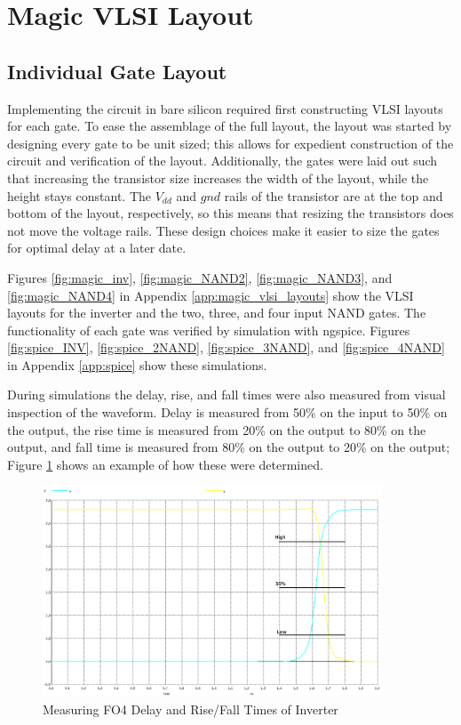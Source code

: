 \documentclass[12pt]{article}
\begin{document}
\section{Magic VLSI Layout}
\subsection{Individual Gate Layout}
Implementing the circuit in bare silicon required first constructing VLSI layouts for each gate.
To ease the assemblage of the full layout, the layout was started by designing every gate to be unit sized; this allows for expedient construction of the circuit and verification of the layout.
Additionally, the gates were laid out such that increasing the transistor size increases the width of the layout, while the height stays constant.
The \(V_{dd}\) and \(gnd\) rails of the transistor are at the top and bottom of the layout, respectively, so this means that resizing the transistors does not move the voltage rails.
These design choices make it easier to size the gates for optimal delay at a later date.

Figures \ref{fig:magic_inv}, \ref{fig:magic_NAND2}, \ref{fig:magic_NAND3}, and \ref{fig:magic_NAND4} in Appendix \ref{app:magic_vlsi_layouts} show the VLSI layouts for the inverter and the two, three, and four input NAND gates.
The functionality of each gate was verified by simulation with ngspice.
Figures \ref{fig:spice_INV}, \ref{fig:spice_2NAND}, \ref{fig:spice_3NAND}, and \ref{fig:spice_4NAND} in Appendix \ref{app:spice} show these simulations.

During simulations the delay, rise, and fall times were also measured from visual inspection of the waveform.
Delay is measured from 50\% on the input to 50\% on the output, the rise time is measured from 20\% on the output to 80\% on the output, and fall time is measured from 80\% on the output to 20\% on the output; Figure \ref{fig:delay_rise_fall} shows an example of how these were determined.

\begin{figure}[H]
	\centering
	\includegraphics[width=0.9\textwidth, keepaspectratio]{Graphics/FO4_Delay}
	\caption{Measuring FO4 Delay and Rise/Fall Times of Inverter}
	\label{fig:delay_rise_fall}
\end{figure}
\end{document}
